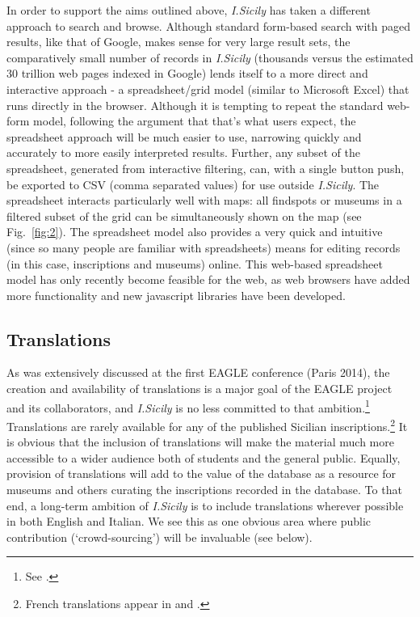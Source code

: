 \documentclass[amsthm,ebook]{saparticle}
\begin{document}
\noindent In order to support the aims outlined above, \emph{I.Sicily} has taken a different approach to search and browse. Although
standard form-based search with paged results, like that of Google, makes sense for very large result sets, the
comparatively small number of records in \emph{I.Sicily} (thousands versus the estimated 30 trillion web pages indexed in
Google) lends itself to a more direct and interactive approach - a spreadsheet/grid model (similar to Microsoft Excel)
that runs directly in the browser. Although it is tempting to repeat the standard web-form model, following the
argument that that’s what users expect, the spreadsheet approach will be much easier to use, narrowing quickly and
accurately to more easily interpreted results. Further, any subset of the spreadsheet, generated from interactive
filtering, can, with a single button push, be exported to CSV (comma separated values) for use outside \emph{I.Sicily}. The
spreadsheet interacts particularly well with maps: all findspots or museums in a filtered subset of the grid can be
simultaneously shown on the map (see Fig.~\ref{fig:2}). The spreadsheet model also provides a very quick and intuitive (since so
many people are familiar with spreadsheets) means for editing records (in this case, inscriptions and museums) online.
This web-based spreadsheet model has only recently become feasible for the web, as web browsers have added more
functionality and new javascript libraries have been developed.




\subsection{Translations}


\noindent As was extensively discussed at the first EAGLE conference (Paris 2014), the creation and availability of translations
is a major goal of the EAGLE project and its collaborators, and \emph{I.Sicily} is no less committed to that
ambition.\footnote{See \citet[Part II]{OrlandiCasarosa2014}.} Translations are rarely available for any of the published
Sicilian inscriptions.\footnote{French translations appear in \citet{dubois_inscriptions_1989} and \citet{dubois_inscriptions_2008}.} It is obvious that the
inclusion of translations will make the material much more accessible to a wider audience both of students and the
general public. Equally, provision of translations will add to the value of the database as a resource for museums and
others curating the inscriptions recorded in the database. To that end, a long-term ambition of \emph{I.Sicily} is to include
translations wherever possible in both English and Italian. We see this as one obvious area where public contribution
(`crowd-sourcing') will be invaluable (see below).
\end{document}

